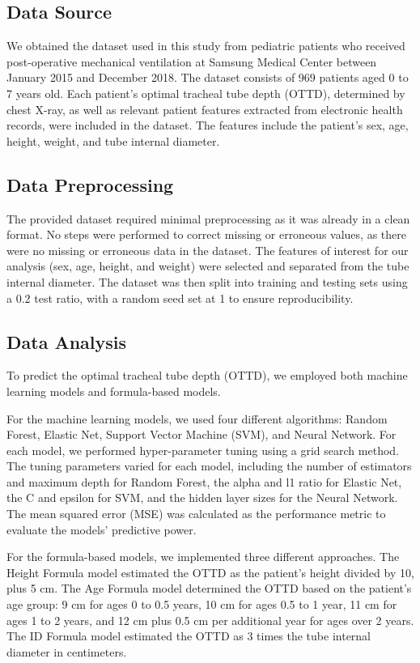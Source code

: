 \documentclass[11pt]{article}
\begin{document}
\subsection*{Data Source}
We obtained the dataset used in this study from pediatric patients who received post-operative mechanical ventilation at Samsung Medical Center between January 2015 and December 2018. The dataset consists of 969 patients aged 0 to 7 years old. Each patient's optimal tracheal tube depth (OTTD), determined by chest X-ray, as well as relevant patient features extracted from electronic health records, were included in the dataset. The features include the patient's sex, age, height, weight, and tube internal diameter.

\subsection*{Data Preprocessing}
The provided dataset required minimal preprocessing as it was already in a clean format. No steps were performed to correct missing or erroneous values, as there were no missing or erroneous data in the dataset. The features of interest for our analysis (sex, age, height, and weight) were selected and separated from the tube internal diameter. The dataset was then split into training and testing sets using a 0.2 test ratio, with a random seed set at 1 to ensure reproducibility.

\subsection*{Data Analysis}
To predict the optimal tracheal tube depth (OTTD), we employed both machine learning models and formula-based models.

For the machine learning models, we used four different algorithms: Random Forest, Elastic Net, Support Vector Machine (SVM), and Neural Network. For each model, we performed hyper-parameter tuning using a grid search method. The tuning parameters varied for each model, including the number of estimators and maximum depth for Random Forest, the alpha and l1 ratio for Elastic Net, the C and epsilon for SVM, and the hidden layer sizes for the Neural Network. The mean squared error (MSE) was calculated as the performance metric to evaluate the models' predictive power.

For the formula-based models, we implemented three different approaches. The Height Formula model estimated the OTTD as the patient's height divided by 10, plus 5 cm. The Age Formula model determined the OTTD based on the patient's age group: 9 cm for ages 0 to 0.5 years, 10 cm for ages 0.5 to 1 year, 11 cm for ages 1 to 2 years, and 12 cm plus 0.5 cm per additional year for ages over 2 years. The ID Formula model estimated the OTTD as 3 times the tube internal diameter in centimeters.
\end{document}
